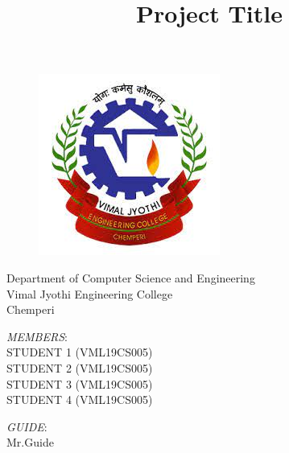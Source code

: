 \documentclass[svgnames,9pt]{beamer}
\title[ShortTitle]{\huge \textbf{Project Title}} %
\author[Group1]{}
\date{}
\begin{document}
	\begin{frame}
		
		\begin{figure}[h!]
			\includegraphics[scale=0.25]{img/vjec}
		\end{figure}
		
		\begin{center}      
			\begin{minipage}[b]{1.0\textwidth}
				\centering
				Department of Computer Science and Engineering\\
				Vimal Jyothi Engineering College\\ Chemperi
			\end{minipage}%
		\end{center}
		
		\titlepage
		
		\begin{minipage}[t]{0.5\textwidth}
			\vspace{-2cm}
			\begin{flushleft}
				{ \textit{MEMBERS}:\vspace*{0.1cm} \\STUDENT 1 (VML19CS005)\\STUDENT 2 (VML19CS005)\\STUDENT 3 (VML19CS005)\\STUDENT 4 (VML19CS005) } %
			\end{flushleft}
		\end{minipage}%
		\begin{minipage}[t]{0.5\textwidth}
			\vspace{-2cm}
			\begin{flushright}
				{\textit{GUIDE}:\vspace*{0.1cm} \\ Mr.Guide} %
			\end{flushright}    
		\end{minipage}%
	\end{frame}
\end{document}
